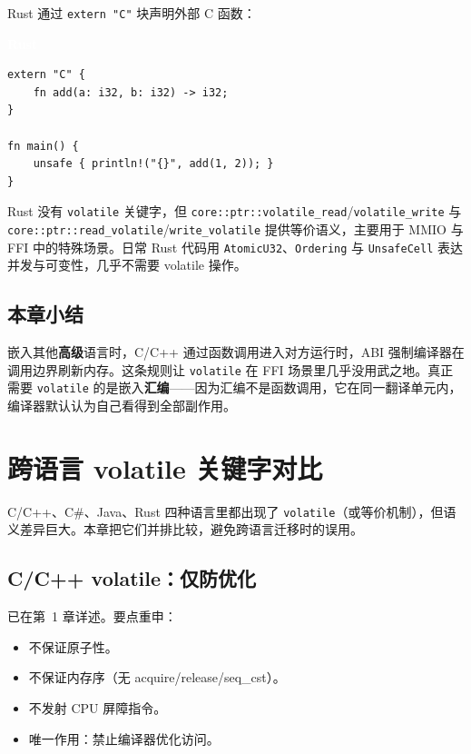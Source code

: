 \documentclass[12pt,a4paper,fontset=fandol]{ctexbook}
\newcommand{\rustlabel}{%
  \begin{tcolorbox}[enhanced,colback=rustheadbg,colframe=rustheadbg,
    arc=1mm,boxrule=0mm,left=6pt,right=6pt,top=2pt,bottom=2pt,
    halign=left,oversize]
    \textcolor{white}{\small\bfseries Rust}
  \end{tcolorbox}\vspace{-4pt}}
\newcommand{\cpp}[1]{C++#1}
\newcommand{\kw}[1]{\texttt{#1}}
\begin{document}
Rust 通过 \texttt{extern "C"} 块声明外部 C 函数：

\rustlabel
\begin{lstlisting}[style=ruststyle]
extern "C" {
    fn add(a: i32, b: i32) -> i32;
}

fn main() {
    unsafe { println!("{}", add(1, 2)); }
}
\end{lstlisting}

Rust 没有 \kw{volatile} 关键字，但 \texttt{core::ptr::volatile\_read}/\allowbreak{}\texttt{volatile\_write} 与 \texttt{core::ptr::read\_volatile}/\allowbreak{}\texttt{write\_volatile} 提供等价语义，主要用于 MMIO 与 FFI 中的特殊场景。日常 Rust 代码用 \texttt{AtomicU32}、\texttt{Ordering} 与 \texttt{UnsafeCell} 表达并发与可变性，几乎不需要 volatile 操作。

\section{本章小结}\label{sec:ffi-summary}

嵌入其他\textbf{高级}语言时，C/\allowbreak{}\cpp{} 通过函数调用进入对方运行时，ABI 强制编译器在调用边界刷新内存。这条规则让 \kw{volatile} 在 FFI 场景里几乎没用武之地。真正需要 \kw{volatile} 的是嵌入\textbf{汇编}——因为汇编不是函数调用，它在同一翻译单元内，编译器默认认为自己看得到全部副作用。

\chapter{跨语言 volatile 关键字对比}\label{ch:cross-lang}

C/\allowbreak{}\cpp{}、C\#、Java、Rust 四种语言里都出现了 \kw{volatile}（或等价机制），但语义差异巨大。本章把它们并排比较，避免跨语言迁移时的误用。

\section{C/C++ volatile：仅防优化}\label{sec:cpp-volatile}

已在第~1 章详述。要点重申：

\begin{itemize}[nosep]
  \item 不保证原子性。
  \item 不保证内存序（无 acquire/release/seq\_cst）。
  \item 不发射 CPU 屏障指令。
  \item 唯一作用：禁止编译器优化访问。
\end{itemize}
\end{document}
